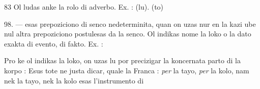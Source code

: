 \begin{VUpage}[87]{83}
Ol ludas anke la rolo di adverbo. Ex. : \cc
{} (lu). \nl
{} (to) 

\VUblanc{5.95pt}%
98. ---  esas prepoziciono di senco nedeterminita,\nl
quan on uzas nur en la kazi ube nul altra prepoziciono\nl
postulesas da la senco. Ol indikas nome la loko o la dato\nl
exakta di evento, di fakto. Ex. : \nl
{}

Pro ke ol indikas la loko, on uzas lu por precizigar la\nl
koncernata parto di la korpo : \nl
{}\nl
Esus tote ne justa dicar, quale la Franca : \textit{per} la tayo, \textit{per}\nl
la kolo, nam nek la tayo, nek la kolo esas l'instrumento di\parplein
\end{VUpage}

